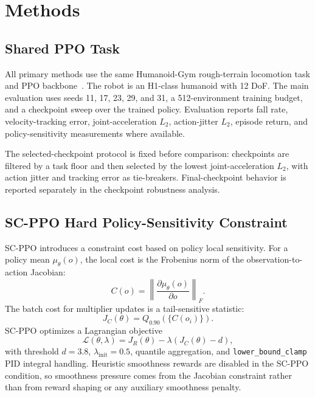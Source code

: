 \documentclass[10pt]{article}
\begin{document}
\section{Methods}

\subsection{Shared PPO Task}

All primary methods use the same Humanoid-Gym rough-terrain locomotion task and
PPO backbone~\citep{Schulman2017PPO}. The robot is an H1-class humanoid with
12 DoF. The main evaluation uses seeds 11, 17, 23, 29, and 31, a
512-environment training budget, and a checkpoint sweep over the trained policy.
Evaluation reports fall rate, velocity-tracking error, joint-acceleration
$L_2$, action-jitter $L_2$, episode return, and policy-sensitivity measurements
where available.

The selected-checkpoint protocol is fixed before comparison: checkpoints are
filtered by a task floor and then selected by the lowest joint-acceleration
$L_2$, with action jitter and tracking error as tie-breakers. Final-checkpoint
behavior is reported separately in the checkpoint robustness analysis.

\subsection{SC-PPO Hard Policy-Sensitivity Constraint}

SC-PPO introduces a constraint cost based on policy local sensitivity. For a
policy mean $\mu_\theta(o)$, the local cost is the Frobenius norm of the
observation-to-action Jacobian:
\begin{equation}
  C(o) = \left\| \frac{\partial \mu_\theta(o)}{\partial o} \right\|_F .
\end{equation}
The batch cost for multiplier updates is a tail-sensitive statistic:
\begin{equation}
  J_C(\theta) = Q_{0.90}\left(\{C(o_i)\}\right).
\end{equation}
SC-PPO optimizes a Lagrangian objective
\begin{equation}
  \mathcal{L}(\theta,\lambda) =
  J_R(\theta) - \lambda \left(J_C(\theta) - d\right),
\end{equation}
with threshold $d=3.8$, $\lambda_{\mathrm{init}}=0.5$, quantile aggregation,
and \texttt{lower\_bound\_clamp} PID integral handling. Heuristic smoothness
rewards are disabled in the SC-PPO condition, so smoothness pressure comes from
the Jacobian constraint rather than from reward shaping or any auxiliary
smoothness penalty.
\end{document}
